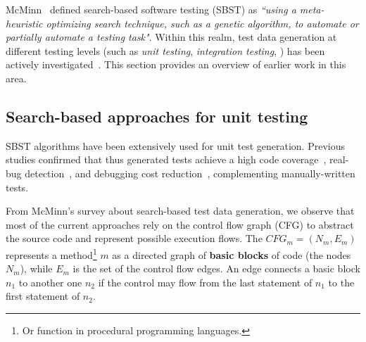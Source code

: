 
McMinn~\cite{McMinn2004} defined search-based software testing (SBST) as \textit{``using a meta-heuristic optimizing search technique, such as a genetic algorithm, to automate or partially automate a testing task"}.
Within this realm, test data generation at different testing levels (such as \textit{unit testing}, \textit{integration testing}, \etc) has been actively investigated~\cite{McMinn2004}. This section 
provides an overview of earlier work in this area.



\subsection{Search-based approaches for unit testing}
SBST algorithms have been extensively used for unit test generation. Previous studies confirmed that thus generated tests achieve a high code coverage~\cite{Panichella2018a, Campos2018}, real-bug detection~\cite{almasi2017industrial}, and debugging cost reduction~\cite{soltani2017, Panichella2016}, complementing manually-written tests.


From McMinn's \cite{McMinn2004} survey about search-based test data generation, we observe that most of the current approaches rely on the control flow graph (CFG) to 
abstract the source code and represent possible execution flows. The $CFG_m=(N_m,E_m)$ represents a method\footnote{Or function in procedural programming languages.} $m$ as a directed graph of \textbf{basic blocks} of code (the nodes $N_m$), while $E_m$ is the set of the control flow edges. An edge connects a basic block $n_1$ to another one $n_2$ if the control may flow from the last statement of $n_1$ to the first statement of $n_2$.

